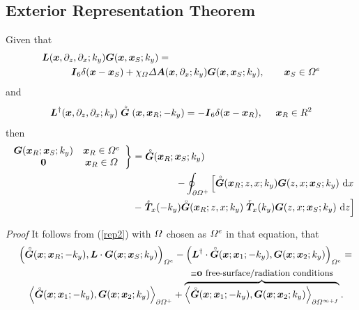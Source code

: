 \subsection{Exterior Representation Theorem}
{} Given that
 \begin{eqnarray*}
\lefteqn{{\bmi L}({\bmi x},\partial_{z},\partial_{x};k_y) {\bmi G}({\bmi
x},{\bmi x}_{S};k_y) =}\nonumber \\
&&\qquad
{\bmi I}_{6}\delta({\bmi x}-{\bmi x}_{S}) + 
{\chi}_{{{\mit \Omega}}} {\mit \Delta} {\bmi A}({\bmi
x},\partial_{x};k_y) {\bmi G}({\bmi x},{\bmi x}_{S};k_y),\qquad {\bmi 
x}_{S}\in{\mit \Omega}^{e}
\end{eqnarray*}
and
\begin{displaymath}
{\bmi L}^{\dagger}({\bmi x},\partial_{z},\partial_{x};k_y) \rf{\bmi G}({\bmi
x},{\bmi x}_{R};-k_y) = -{\bmi I}_{6}\delta({\bmi x}-{\bmi x}_{R}),\ \ \ \ {\bmi 
x}_{R}\in{R}^{2}
\end{displaymath}
then
\begin{eqnarray*}
\lefteqn{
\left.
\begin{array}{cc}
{{\bmi G}}({\bmi x}_{R};{\bmi x}_{S};k_y)& {\bmi x}_{R}\in {\mit \Omega}^{e}\\
{\bf 0}&{\bmi x}_{R}\in {\mit \Omega}
\end{array}  \right\}
={\rf{\bmi G}}({\bmi x}_{R};{\bmi x}_{S};k_y)
}\\
&&
\qquad\qquad\qquad\qquad\qquad\qquad
-\oint_{\partial {\mit \Omega}^{+}} \left[ {\rf{\bmi G}}({\bmi x}_{R};{z, x};k_y) 
{{\bmi G}}({z, x};{\bmi x}_{S};k_y) \  {\rm d}x \right.\\
&&
\qquad\qquad\qquad\qquad\qquad\qquad
- \left.\stackrel{\scriptscriptstyle _s}{\bmi T}{}_{\!\!\! x}(-k_y){\rf{\bmi 
G}}({\bmi x}_{R};{z, x};k_y)  
\stackrel{\scriptscriptstyle _r}{\bmi T}{}_{\!\!\! x}(k_y){{\bmi G}}({z, 
x};{\bmi x}_{S};k_y) \ {\rm d}z \right]
\end{eqnarray*}

{\em Proof}
It follows from (\ref{rep2}) with ${\mit \Omega}$ chosen as ${\mit 
\Omega^{e}}$ in that 
equation, that
\begin{eqnarray} \label{rep02}
\lefteqn{
\left({\rf{\bmi G}}({\bmi x};{\bmi x}_{R};-k_y),{\bmi L}\cdot{{\bmi 
G}}({\bmi x};{\bmi x}_{S};k_y)\right)_{{\mit \Omega}^{e}}-
\left({\bmi L}^{\dagger}\cdot{\rf{\bmi G}}({\bmi x};{\bmi x}_{1};-k_y),{ 
{\bmi G}}({\bmi x};{\bmi x}_{2};k_y)\right)_{{\mit \Omega}^{e}}=}\nonumber\\
&&
\left\langle{\rf{\bmi G}}({\bmi x};{\bmi x}_{1};-k_y),{{\bmi 
G}}({\bmi x};{\bmi x}_{2};k_y)\right\rangle_{\partial{\mit \Omega}^{+}}
+\overbrace{\left\langle{\rf{\bmi G}}({\bmi x};{\bmi x}_{1};-k_y),
{{\bmi G}}({\bmi x};{\bmi 
x}_{2};k_y)\right\rangle_{\partial{\mit \Omega}^{{\scriptscriptstyle \infty + 
f}}}}^{\equiv {\bmi 0}\ \small
\mbox{free-surface/radiation  conditions}}.
\end{eqnarray} 



